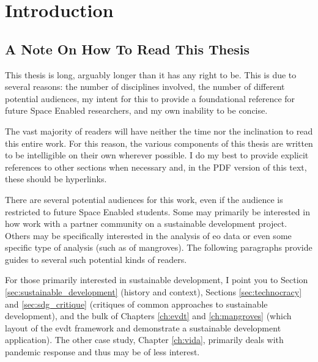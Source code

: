 \chapter{Introduction} \label{ch:intro}

\section{A Note On How To Read This Thesis} \label{sec:audiences}

This thesis is long, arguably longer than it has any right to be. This is due to several reasons: the number of disciplines involved, the number of different potential audiences, my intent for this to provide a foundational reference for future Space Enabled researchers, and my own inability to be concise. 

The vast majority of readers will have neither the time nor the inclination to read this entire work. For this reason, the various components of this thesis are written to be intelligible on their own wherever possible. I do my best to provide explicit references to other sections when necessary and, in the PDF version of this text, these should be hyperlinks. 

There are several potential audiences for this work, even if the audience is restricted to future Space Enabled students. Some may primarily be interested in how work with a partner community on a sustainable development project. Others may be specifically interested in the analysis of \ac{eo} data or even some specific type of analysis (such as of mangroves). The following paragraphs provide guides to several such potential kinds of readers. 

For those primarily interested in sustainable development, I point you to Section \ref{sec:sustainable_development} (history and context), Sections \ref{sec:technocracy} and \ref{sec:sdg_critique} (critiques of common approaches to sustainable development), and the bulk of Chapters \ref{ch:evdt} and \ref{ch:mangroves} (which layout of the \ac{evdt} framework and demonstrate a sustainable development application). The other case study, Chapter \ref{ch:vida}, primarily deals with pandemic response and thus may be of less interest.

